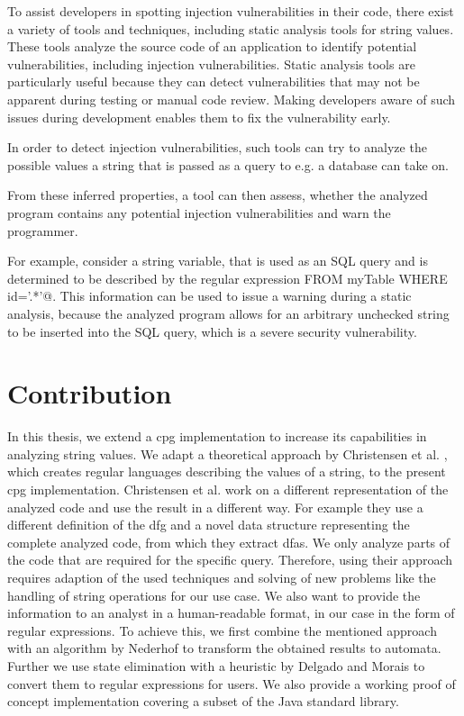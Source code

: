 To assist developers in spotting injection vulnerabilities in their code, there exist a variety of tools and techniques, including static analysis tools for string values. These tools analyze the source code of an application to identify potential vulnerabilities, including injection vulnerabilities. Static analysis tools are particularly useful because they can detect vulnerabilities that may not be apparent during testing or manual code review. Making developers aware of such issues during development enables them to fix the vulnerability early.

In order to detect injection vulnerabilities, such tools can try to analyze the possible values a string that is passed as a query to e.g. a database can take on.

From these inferred properties, a tool can then assess, whether the analyzed program contains any potential injection vulnerabilities and warn the programmer.

For example, consider a string variable, that is used as an SQL query and is determined to be described by the regular expression \Verb@DELETE \* FROM myTable WHERE id='.*'@.
This information can be used to issue a warning during a static analysis, because the analyzed program allows for an arbitrary unchecked string to be inserted into the SQL query, which is a severe security vulnerability.

\section{Contribution}

In this thesis, we extend a \acf{cpg} implementation \cite{cpg} to increase its capabilities in analyzing string values. We adapt a theoretical approach by Christensen et al. \cite{brics}, which creates regular languages describing the values of a string, to the present \ac{cpg} implementation. Christensen et al. work on a different representation of the analyzed code and use the result in a different way. For example they use a different definition of the \ac{dfg} and a novel data structure representing the complete analyzed code, from which they extract \acp{dfa}. We only analyze parts of the code that are required for the specific query. Therefore, using their approach requires adaption of the used techniques and solving of new problems like the handling of string operations for our use case. We also want to provide the information to an analyst in a human-readable format, in our case in the form of regular expressions.
To achieve this, we first combine the mentioned approach with an algorithm by Nederhof \cite{nederhof} to transform the obtained results to automata. Further we use state elimination with a heuristic by Delgado and Morais \cite{delgado} to convert them to regular expressions for users. We also provide a working proof of concept implementation covering a subset of the Java standard library.

